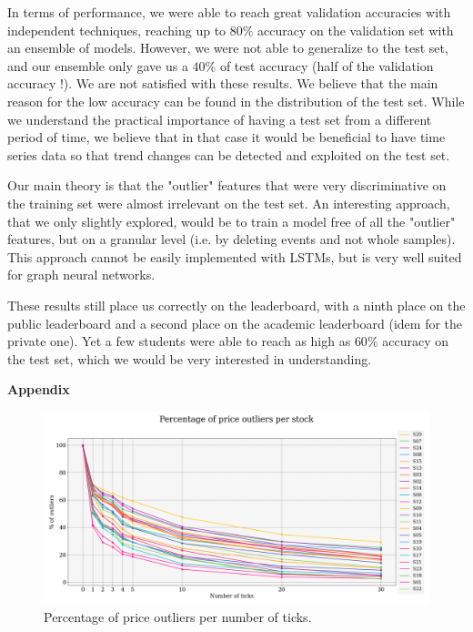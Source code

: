 \documentclass[switch, 11pt]{article}
\begin{document}
\begin{multicols}{2}
    In terms of performance, we were able to reach great validation accuracies with independent techniques, reaching up to $80\%$ accuracy on the validation set with an ensemble of models. However, we were not able to generalize to the test set, and our ensemble only gave us a $40\%$ of test accuracy (half of the validation accuracy !). We are not satisfied with these results. We believe that the main reason for the low accuracy can be found in the distribution of the test set. While we understand the practical importance of having a test set from a different period of time, we believe that in that case it would be beneficial to have time series data so that trend changes can be detected and exploited on the test set.

    Our main theory is that the "outlier" features that were very discriminative on the training set were almost irrelevant on the test set. An interesting approach, that we only slightly explored, would be to train a model free of all the "outlier" features, but on a granular level (i.e. by deleting events and not whole samples). This approach cannot be easily implemented with LSTMs, but is very well suited for graph neural networks.

    These results still place us correctly on the leaderboard, with a ninth place on the public leaderboard and a second place on the academic leaderboard (idem for the private one). Yet a few students were able to reach as high as $60\%$ accuracy on the test set, which we would be very interested in understanding.

    \newpage

    

\end{multicols}

\newpage
\appendix
\begin{center}
    {\Large \bfseries Appendix} \\
\end{center}
\begin{figure}[H]
    \centering
    \includegraphics[width=\columnwidth]{figures/percentage_outliers_per_stock.png}
    \caption{Percentage of price outliers per number of ticks.}
    \label{fig:nb_outliers}
\end{figure}
\end{document}
